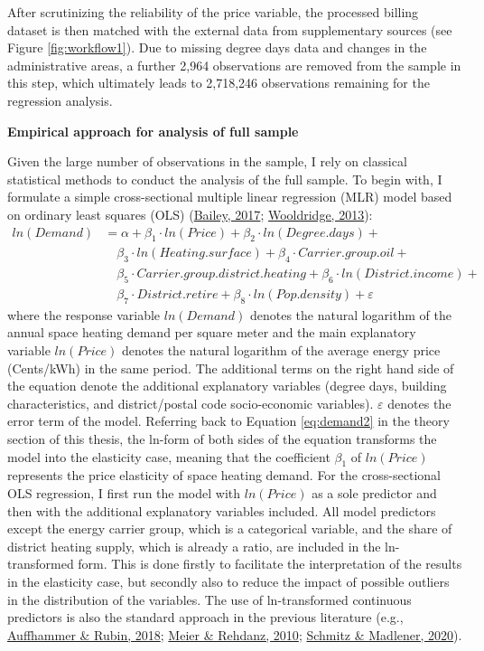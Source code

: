 \documentclass[12pt,twoside]{reedthesis}
\begin{document}
After scrutinizing the reliability of the price variable, the processed billing dataset is then matched with the external data from supplementary sources (see Figure \ref{fig:workflow1}). Due to missing degree days data and changes in the administrative areas, a further 2,964 observations are removed from the sample in this step, which ultimately leads to 2,718,246 observations remaining for the regression analysis.

\textbf{Empirical approach for analysis of full sample}

Given the large number of observations in the sample, I rely on classical statistical methods to conduct the analysis of the full sample. To begin with, I formulate a simple cross-sectional multiple linear regression (MLR) model based on ordinary least squares (OLS) (\protect\hyperlink{ref-bailey17}{Bailey, 2017}; \protect\hyperlink{ref-wooldridge13}{Wooldridge, 2013}):
\begin{align*}
ln(Demand) & = \alpha + \beta_1 \cdot ln(Price) + \beta_2 \cdot ln(Degree.days) + \\
 & \quad \beta_3 \cdot ln(Heating.surface) + \beta_{4} \cdot Carrier.group.oil + \\
 & \quad \beta_{5} \cdot Carrier.group.district.heating + \beta_{6} \cdot ln(District.income) + \\
 & \quad \beta_{7} \cdot District.retire + \beta_{8} \cdot ln(Pop.density) + \varepsilon 
\end{align*}
where the response variable \(ln(Demand)\) denotes the natural logarithm of the annual space heating demand per square meter and the main explanatory variable \(ln(Price)\) denotes the natural logarithm of the average energy price (Cents/kWh) in the same period. The additional terms on the right hand side of the equation denote the additional explanatory variables (degree days, building characteristics, and district/postal code socio-economic variables). \(\varepsilon\) denotes the error term of the model. Referring back to Equation \eqref{eq:demand2} in the theory section of this thesis, the ln-form of both sides of the equation transforms the model into the elasticity case, meaning that the coefficient \(\beta_1\) of \(ln(Price)\) represents the price elasticity of space heating demand. For the cross-sectional OLS regression, I first run the model with \(ln(Price)\) as a sole predictor and then with the additional explanatory variables included. All model predictors except the energy carrier group, which is a categorical variable, and the share of district heating supply, which is already a ratio, are included in the ln-transformed form. This is done firstly to facilitate the interpretation of the results in the elasticity case, but secondly also to reduce the impact of possible outliers in the distribution of the variables. The use of ln-transformed continuous predictors is also the standard approach in the previous literature (e.g., \protect\hyperlink{ref-auffhammer_rubin18}{Auffhammer \& Rubin, 2018}; \protect\hyperlink{ref-meier_rehdanz10}{Meier \& Rehdanz, 2010}; \protect\hyperlink{ref-schmitz_madlener20}{Schmitz \& Madlener, 2020}).
\end{document}
